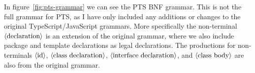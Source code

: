 In figure~\vref{fig:pts-grammar} we can see the PTS BNF grammar.
This is not the full grammar for PTS, as I have only included any additions or changes to the original TypeScript/JavaScript grammars.
More specifically the non-terminal $\langle \textrm{declaration} \rangle$ is an extension of the original grammar, where we also include package and template declarations as legal declarations.
The productions for non-terminals $\langle \textrm{id} \rangle$, $\langle \textrm{class declaration} \rangle$, $\langle \textrm{interface declaration} \rangle$, and $\langle \textrm{class body} \rangle$ are also from the original grammar.

\begin{figure}
    \begin{bnf*}
        { \bnfsk \bnfor {} \bnfor {} }\\
        {  \bnfsp {} \bnfsp {} }\\
        {  \bnfsp {} \bnfsp {} }\\
        { \bnfts{\{} \bnfsp {} \bnfsp \bnfts{\}} }\\
        {  \bnfsp {} \bnfor \bnfes}\\
        {  \bnfor {} \bnfor }\\
        \\
        {  \bnfsp {} \bnfsp {} }\\
        { \bnfts{\{} \bnfsp {} \bnfsp \bnfts{\}} \bnfor \bnfes }\\
        {  \bnfor {} \bnfts{,} \bnfsp {} }\\
        {  \bnfsp {} }\\
        { \bnfts{(} \bnfsp {} \bnfsp \bnfts{)} \bnfor \bnfes }\\
        {  \bnfor {} \bnfts{,} \bnfsp {} }\\

\end{bnf*}
\end{figure}
